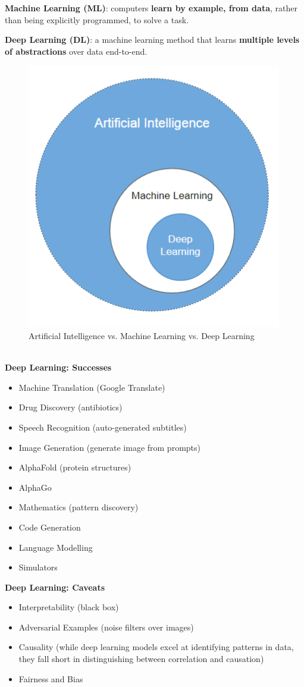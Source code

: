 \begin{definition}
    \textbf{Machine Learning (ML)}: computers \textbf{learn by example, from data}, rather than being explicitly programmed, to solve a task. 
\end{definition}
\begin{definition}
    \textbf{Deep Learning (DL)}: a machine learning method that learns \textbf{multiple levels of abstractions} over data end-to-end.
\end{definition}
\begin{figure}[h!t]
    \centering
    \includegraphics[width=0.25\linewidth]{aimldl.png}
    \caption{Artificial Intelligence vs. Machine Learning vs. Deep Learning}
    \label{fig:enter-label}
\end{figure}
\textbf{\\Deep Learning: Successes}
\begin{itemize}
    \item Machine Translation (Google Translate)
    \item Drug Discovery (antibiotics)
    \item Speech Recognition (auto-generated subtitles)
    \item Image Generation (generate image from prompts)
    \item AlphaFold (protein structures)
    \item AlphaGo
    \item Mathematics (pattern discovery)
    \item Code Generation
    \item Language Modelling
    \item Simulators
\end{itemize}
\textbf{Deep Learning: Caveats}
\begin{itemize}
    \item Interpretability (black box)
    \item Adversarial Examples (noise filters over images)
    \item Causality (while deep learning models excel at identifying patterns in data, they fall short in distinguishing between correlation and causation)
    \item Fairness and Bias
\end{itemize}
